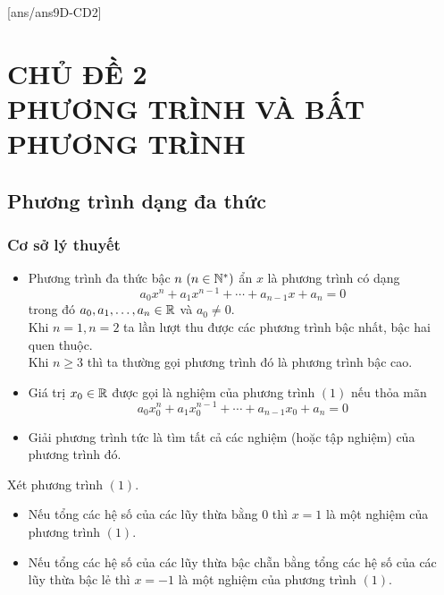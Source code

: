 [ans/ans9D-CD2]
\chapter*{CHỦ ĐỀ 2 \\ PHƯƠNG TRÌNH VÀ BẤT PHƯƠNG TRÌNH}
\setcounter{section}{0}
\section{Phương trình dạng đa thức}
\subsection{Cơ sở lý thuyết}
\begin{dn}\hfill
\begin{itemize}
\item Phương trình đa thức bậc $n \,\,(n\in \Bbb N^*)$ ẩn $x$ là phương trình có dạng 
\[a_0 x^n+ a_1 x^{n-1}+\cdots + a_{n-1} x+a_n=0 \tag{1}\] trong đó $a_0,a_1, \dots , a_n \in \Bbb R$ và $a_0\neq 0$.\\
Khi $n=1,n=2$ ta lần lượt thu được các phương trình bậc nhất, bậc hai quen thuộc.\\
Khi $n\ge 3$ thì ta thường gọi phương trình đó là phương trình bậc cao.
\item Giá trị $x_0 \in \Bbb R$ được gọi là nghiệm của phương trình $(1)$ nếu thỏa mãn
$$a_0 x_0^n+ a_1 x_0^{n-1}+\cdots + a_{n-1} x_0+a_n=0$$
\item Giải phương trình tức là tìm tất cả các nghiệm (hoặc tập nghiệm) của phương trình đó.
\end{itemize}
\end{dn}

\begin{tc} Xét phương trình $(1).$
\begin{itemize}
\item Nếu tổng các hệ số của các lũy thừa bằng $0$ thì $x=1$  là một nghiệm của phương trình $(1)$.
\item Nếu tổng các hệ số của các lũy thừa bậc chẵn bằng tổng các hệ số của các lũy thừa bậc lẻ thì $x=-1$ là một nghiệm của phương trình $(1)$.
\end{itemize}
\end{tc}

